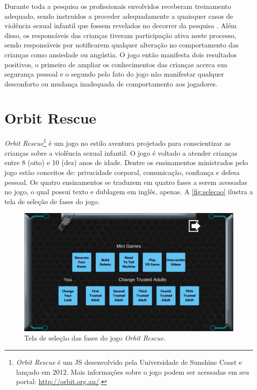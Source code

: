 Durante toda a pesquisa os profissionais envolvidos receberam treinamento adequado, sendo instruídos a proceder adequadamente a quaisquer casos de violência sexual infantil que fossem revelados no decorrer da pesquisa \cite{jones2010being}. Além disso, os responsáveis das crianças tiveram participação ativa neste processo, sendo responsáveis por notificarem qualquer alteração no comportamento das crianças como ansiedade ou angústia. O jogo então manifesta dois resultados positivos, o primeiro de ampliar os conhecimentos das crianças acerca sua segurança pessoal e o segundo pelo fato do jogo não manifestar qualquer desconforto ou mudança inadequada de comportamento aos jogadores. 


\section{Orbit Rescue}\label{sssec:Orbit}

\textit{Orbit Rescue}\footnote{\textit{Orbit Rescue} é um \acf{JS} desenvolvido pela Universidade de Sunshine Coast e lançado em 2012. Mais informações sobre o jogo podem ser acessadas em seu portal: \url{http://orbit.org.au/}.} é um jogo no estilo aventura projetado para conscientizar as crianças sobre a violência sexual infantil. O jogo é voltado a atender crianças entre 8 (oito) e 10 (dez) anos de idade. Dentre os ensinamentos ministrados pelo jogo estão conceitos de: privacidade corporal, comunicação, confiança e defesa pessoal. Os quatro ensinamentos se traduzem em quatro fases a serem acessadas no jogo, o qual possui texto e dublagem em inglês, apenas. A \autoref{fig:selecao} ilustra a tela de seleção de fases do jogo.

\begin{figure}[htb]
	\caption{\label{fig:selecao}Tela de seleção das fases do jogo \textit{Orbit Rescue}.}
  \begin{center}\vspace{-0.3cm}
    \includegraphics[width=0.92\linewidth]{./Visuais/Orbit/OrbitFases.jpg}
	\end{center}\vspace{-0.2cm}
\end{figure}

